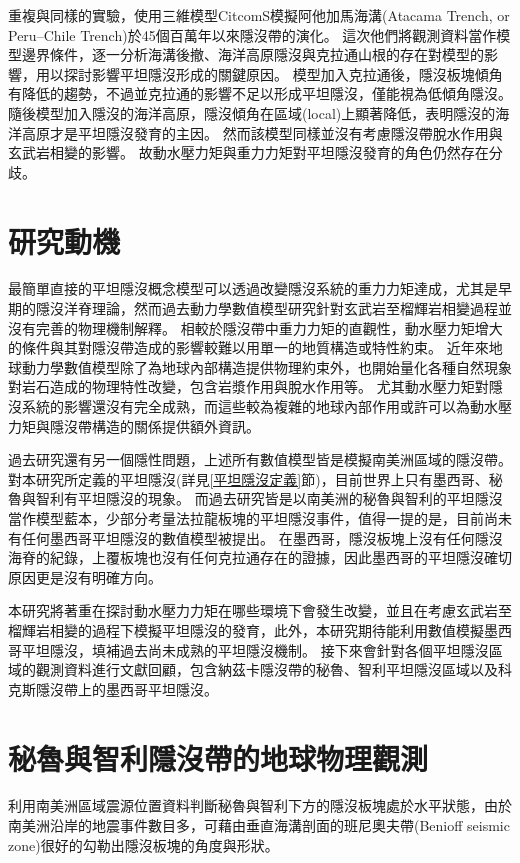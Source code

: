 \citealp{Hu2016}重複與\citealp{Manea2012Chile}同樣的實驗，使用三維模型CitcomS模擬阿他加馬海溝(Atacama Trench, or Peru–Chile Trench)於45個百萬年以來隱沒帶的演化。
這次他們將觀測資料當作模型邊界條件，逐一分析海溝後撤、海洋高原隱沒與克拉通山根的存在對模型的影響，用以探討影響平坦隱沒形成的關鍵原因。
模型加入克拉通後，隱沒板塊傾角有降低的趨勢，不過並克拉通的影響不足以形成平坦隱沒，僅能視為低傾角隱沒。
隨後模型加入隱沒的海洋高原，隱沒傾角在區域(local)上顯著降低，表明隱沒的海洋高原才是平坦隱沒發育的主因。
然而該模型同樣並沒有考慮隱沒帶脫水作用與玄武岩相變的影響。
故動水壓力矩與重力力矩對平坦隱沒發育的角色仍然存在分歧。

\section{研究動機}\label{研究動機}
最簡單直接的平坦隱沒概念模型可以透過改變隱沒系統的重力力矩達成，尤其是早期的隱沒洋脊理論，然而過去動力學數值模型研究針對玄武岩至榴輝岩相變過程並沒有完善的物理機制解釋。
相較於隱沒帶中重力力矩的直觀性，動水壓力矩增大的條件與其對隱沒帶造成的影響較難以用單一的地質構造或特性約束。
近年來地球動力學數值模型除了為地球內部構造提供物理約束外，也開始量化各種自然現象對岩石造成的物理特性改變，包含岩漿作用與脫水作用等。
尤其動水壓力矩對隱沒系統的影響還沒有完全成熟，而這些較為複雜的地球內部作用或許可以為動水壓力矩與隱沒帶構造的關係提供額外資訊。

過去研究還有另一個隱性問題，上述所有數值模型皆是模擬南美洲區域的隱沒帶。
對本研究所定義的平坦隱沒(詳見\ref{平坦隱沒定義}節)，目前世界上只有墨西哥、秘魯與智利有平坦隱沒的現象。
而過去研究皆是以南美洲的秘魯與智利的平坦隱沒當作模型藍本，少部分考量法拉龍板塊的平坦隱沒事件，值得一提的是，目前尚未有任何墨西哥平坦隱沒的數值模型被提出。
在墨西哥，隱沒板塊上沒有任何隱沒海脊的紀錄，上覆板塊也沒有任何克拉通存在的證據，因此墨西哥的平坦隱沒確切原因更是沒有明確方向。

本研究將著重在探討動水壓力力矩在哪些環境下會發生改變，並且在考慮玄武岩至榴輝岩相變的過程下模擬平坦隱沒的發育，此外，本研究期待能利用數值模擬墨西哥平坦隱沒，填補過去尚未成熟的平坦隱沒機制。
接下來會針對各個平坦隱沒區域的觀測資料進行文獻回顧，包含納茲卡隱沒帶的秘魯、智利平坦隱沒區域以及科克斯隱沒帶上的墨西哥平坦隱沒。


\section{秘魯與智利隱沒帶的地球物理觀測}\label{秘魯與智利隱沒帶地球物理觀測}
\citealp{barazangi1976}利用南美洲區域震源位置資料判斷秘魯與智利下方的隱沒板塊處於水平狀態，由於南美洲沿岸的地震事件數目多，可藉由垂直海溝剖面的班尼奧夫帶(Benioff seismic zone)很好的勾勒出隱沒板塊的角度與形狀。

